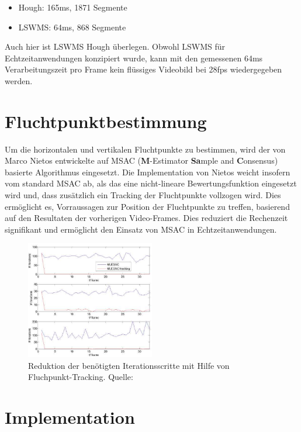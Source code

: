 \begin{itemize}
	\item Hough: 165ms, 1871 Segmente
	\item LSWMS: 64ms, 868 Segmente
\end{itemize}
\noindent
Auch hier ist LSWMS Hough überlegen. Obwohl LSWMS für Echtzeitanwendungen konzipiert wurde, kann mit den gemessenen 64ms Verarbeitungszeit pro Frame kein flüssiges Videobild bei 28fps wiedergegeben werden.

\section{Fluchtpunktbestimmung}
Um die horizontalen und vertikalen Fluchtpunkte zu bestimmen, wird der von Marco Nietos entwickelte \cite{nieto-msac} auf MSAC (\textbf{M}-Estimator \textbf{Sa}mple and \textbf{C}onsensus) basierte Algorithmus eingesetzt. Die Implementation von Nietos weicht insofern vom standard MSAC ab, als das eine nicht-lineare Bewertungsfunktion eingesetzt wird und, dass zusätzlich ein Tracking der Fluchtpunkte vollzogen wird. Dies ermöglicht es, Vorraussagen zur Position der Fluchtpunkte zu treffen, basierend auf den Resultaten der vorherigen Video-Frames. Dies reduziert die Rechenzeit signifikant und ermöglicht den Einsatz von MSAC in Echtzeitanwendungen.

\begin{figure}[!ht]
\centering
\includegraphics[width=0.5\textwidth]{images/msac} 
\caption{Reduktion der benötigten Iterationsscritte mit Hilfe von Fluchpunkt-Tracking. Quelle: \cite{nieto-msac}}
\label{fig:door-detection}
\end{figure}

\section{Implementation}

